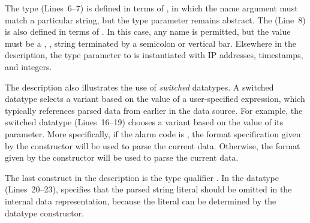 The  type (Lines~6--7) is defined in terms of , in
which the name argument must match a particular string, but the type
parameter remains abstract.  The  (Line~8) is also defined
in terms of .  In this case, any name is permitted, but the
value must be a , \ie{}, string terminated by a semicolon
or vertical bar.  Elsewhere in the description, the type parameter to
 is instantiated with IP addresses, timestamps, and integers.


The \darkstar{} description also illustrates the use of
\textit{switched} datatypes.  A switched datatype selects a variant
based on the value of a user-specified \ocaml{} expression, which
typically references parsed data from earlier in the data source.  For
example, the switched datatype  (Lines~16--19) chooses a
variant based on the value of its  parameter.  More
specifically, if the alarm code is , the format specification
given by the  constructor will be used to parse the
current data.  Otherwise, the format given by the 
constructor will be used to parse the current data.

The last construct in the \darkstar{} description is the type
qualifier .  In the  datatype (Lines~20--23),
 specifies that the parsed string literal should be omitted
in the internal data representation, because the literal can be
determined by the datatype constructor.


